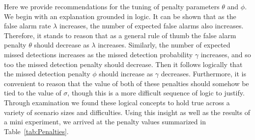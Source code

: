 Here we provide recommendations for the tuning of penalty parameters $\theta$ and $\phi$. We begin with an explanation grounded in logic. It can be shown that as the false alarm rate $\lambda$ increases, the number of expected false alarms also increases. Therefore, it stands to reason that as a general rule of thumb the false alarm penalty $\theta$ should decrease as $\lambda$ increases. Similarly, the number of expected missed detections increases as the missed detection probability $\gamma$ increases, and so too the missed detection penalty should decrease. Then it follows logically that the missed detection penalty $\phi$ should increase as $\gamma$ decreases. Furthermore, it is convenient to reason that the value of both of these penalties should somehow be tied to the value of $\sigma$, though this is a more difficult sequence of logic to justify. Through examination we found these logical concepts to hold true across a variety of scenario sizes and difficulties. Using this insight as well as the results of a mini experiment, we arrived at the penalty values summarized in Table~\ref{tab:Penalties}.


